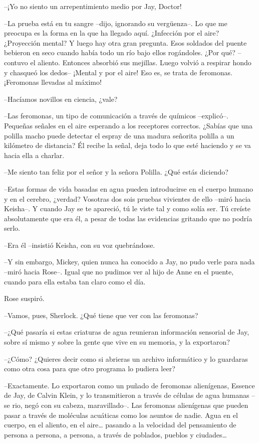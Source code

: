 {--¡Yo no siento un arrepentimiento medio por Jay, Doctor!}

{--La prueba está en tu sangre --dijo, ignorando su vergüenza--. Lo que
 me preocupa es la forma en la que ha llegado aquí. ¿Infección por el
 aire? ¿Proyección mental? Y luego hay otra gran pregunta. Esos soldados
 del puente bebieron en seco cuando había todo un río bajo ellos
 rogándoles. ¿Por qué? --contuvo el aliento. Entonces absorbió sus
 mejillas. Luego volvió a respirar hondo y chasqueó los dedos-- ¡Mental y
 por el aire! Eso es, se trata de feromonas. ¡Feromonas llevadas al
máximo!}

{--Hacíamos novillos en ciencia, ¿vale?}

{--Las feromonas, un tipo de comunicación a través de químicos
 --explicó--. Pequeñas señales en el aire esperando a los receptores
 correctos. ¿Sabías que una polilla macho puede detectar el espray de una
 madura señorita polilla a un kilómetro de distancia? Él recibe la señal,
deja todo lo que esté haciendo y se va hacia ella a charlar.}

{--Me siento tan feliz por el señor y la señora Polilla. ¿Qué estás
diciendo?}

{--Estas formas de vida basadas en agua pueden introducirse en el cuerpo
 humano y en el cerebro, ¿verdad? Vosotras dos sois pruebas vivientes de
 ello --miró hacia Keisha--. Y cuando Jay se te apareció, tú le viste tal
 y como solía ser. Tú creíste absolutamente que era él, a pesar de todas
las evidencias gritando que no podría serlo.}

{--Era él --insistió Keisha, con su voz quebrándose.}

{--Y sin embargo, Mickey, quien nunca ha conocido a Jay, no pudo verle
 para nada --miró hacia Rose--. Igual que no pudimos ver al hijo de Anne
en el puente, cuando para ella estaba tan claro como el día.}

{Rose suspiró.}

{--Vamos, pues, Sherlock. ¿Qué tiene que ver con las feromonas?}

{--¿Qué pasaría si estas criaturas de agua reunieran información
 sensorial de Jay, sobre sí mismo y sobre la gente que vive en su
memoria, y la exportaron?}

{--¿Cómo? ¿Quieres decir como si abrieras un archivo informático y lo
guardaras como otra cosa para que otro programa lo pudiera leer?}

{--Exactamente. Lo exportaron como un puñado de feromonas alienígenas,
 Essence de Jay, de Calvin Klein, y lo transmitieron a través de células
 de agua humanas --se rio, negó con su cabeza, maravillado--. Las
 feromonas alienígenas que pueden pasar a través de moléculas acuáticas
 como los asuntos de nadie. Agua en el cuerpo, en el aliento, en el
 aire\ldots{} pasando a la velocidad del pensamiento de persona a
 persona, a persona, a través de poblados, pueblos y ciudades\ldots{}}


